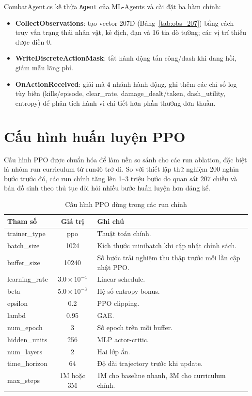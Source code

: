 CombatAgent.cs kế thừa \texttt{Agent} của ML-Agents và cài đặt ba hàm chính:
\begin{itemize}
    \item \textbf{CollectObservations}: tạo vector 207D (Bảng~\ref{tab:obs_207}) bằng cách truy vấn trạng thái nhân vật, kẻ địch, đạn và 16 tia dò tường; các vị trí thiếu được điền 0.
    \item \textbf{WriteDiscreteActionMask}: tắt hành động tấn công/dash khi đang hồi, giảm mẫu lãng phí.
    \item \textbf{OnActionReceived}: giải mã 4 nhánh hành động, ghi thêm các chỉ số log tùy biến (kills/episode, clear\_rate, damage\_dealt/taken, dash\_utility, entropy) để phân tích hành vi chi tiết hơn phần thưởng đơn thuần.
\end{itemize}

\section{Cấu hình huấn luyện PPO}

Cấu hình PPO được chuẩn hóa để làm nền so sánh cho các run ablation, đặc biệt là nhóm run curriculum từ run46 trở đi. So với thiết lập thử nghiệm 200 nghìn bước trước đó, các run chính tăng lên 1--3 triệu bước do quan sát 207 chiều và bản đồ sinh theo thủ tục đòi hỏi nhiều bước huấn luyện hơn đáng kể.

\begin{table}[H]
    \centering
    \small
    \caption{Cấu hình PPO dùng trong các run chính}
    \label{tab:ppo_baseline_config}
    \begin{tabular}{|p{4cm}|c|p{7cm}|}
        \hline
        \textbf{Tham số} & \textbf{Giá trị} & \textbf{Ghi chú} \\
        \hline
        trainer\_type & ppo & Thuật toán chính. \\
        \hline
        batch\_size & 1024 & Kích thước minibatch khi cập nhật chính sách. \\
        \hline
        buffer\_size & 10240 & Số bước trải nghiệm thu thập trước mỗi lần cập nhật PPO. \\
        \hline
        learning\_rate & $3.0 \times 10^{-4}$ & Linear schedule. \\
        \hline
        beta & $5.0 \times 10^{-3}$ & Hệ số entropy bonus. \\
        \hline
        epsilon & 0.2 & PPO clipping. \\
        \hline
        lambd & 0.95 & GAE. \\
        \hline
        num\_epoch & 3 & Số epoch trên mỗi buffer. \\
        \hline
        hidden\_units & 256 & MLP actor-critic. \\
        \hline
        num\_layers & 2 & Hai lớp ẩn. \\
        \hline
        time\_horizon & 64 & Độ dài trajectory trước khi update. \\
        \hline
        max\_steps & 1M hoặc 3M & 1M cho baseline nhanh, 3M cho curriculum chính. \\
        \hline
    \end{tabular}
\end{table}

